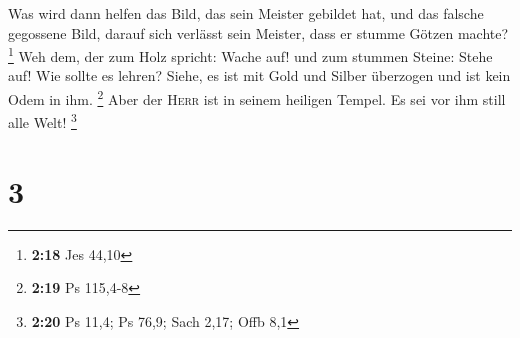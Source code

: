  Was wird dann helfen das Bild, das sein Meister gebildet
hat, und das falsche gegossene Bild, darauf sich verlässt sein Meister,
dass er stumme Götzen machte? \footnote{\textbf{2:18} Jes 44,10}
 Weh dem, der zum Holz spricht: Wache auf! und zum
stummen Steine: Stehe auf! Wie sollte es lehren? Siehe, es ist mit Gold
und Silber überzogen und ist kein Odem in ihm. \footnote{\textbf{2:19}
  Ps 115,4-8}  Aber der \textsc{Herr} ist in seinem
heiligen Tempel. Es sei vor ihm still alle Welt! \footnote{\textbf{2:20}
  Ps 11,4; Ps 76,9; Sach 2,17; Offb 8,1}

\hypertarget{section-1}{%
\section{3}\label{section-1}}

